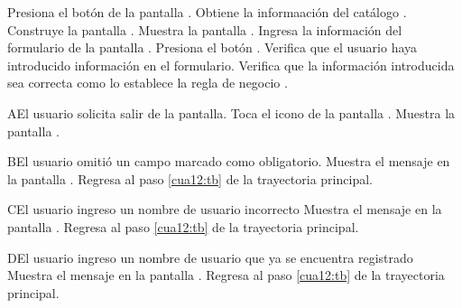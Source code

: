  \begin{UCtrayectoria}
    \UCpaso[\UCactor] Presiona el botón  de la pantalla .
    \UCpaso[\UCsist] Obtiene la informaación del catálogo .
    \UCpaso[\UCsist] Construye la pantalla .
    \UCpaso[\UCsist] Muestra la pantalla .
    \UCpaso[\UCactor] Ingresa la información del formulario de la pantalla . \label{cua15:tb} 
    \UCpaso[\UCactor] Presiona el botón .
    \UCpaso[\UCsist] Verifica que el usuario haya introducido información en el formulario.
    \UCpaso[\UCsist] Verifica que la información introducida sea correcta como lo establece la regla de negocio .
    

 \end{UCtrayectoria}



 
 \begin{UCtrayectoriaA}{A}{El usuario solicita salir de la pantalla.}
    \UCpaso[\UCactor] Toca el icono \btnRegresar de la pantalla .
	\UCpaso[\UCsist] Muestra la pantalla . 
 \end{UCtrayectoriaA}

 \begin{UCtrayectoriaA}{B}{El usuario omitió un campo marcado como obligatorio.}
 	\UCpaso[\UCsist] Muestra el mensaje  en la pantalla .
	\UCpaso[] Regresa al paso \ref{cua12:tb} de la trayectoria principal. 
	
\end{UCtrayectoriaA}


 \begin{UCtrayectoriaA}{C}{El usuario ingreso un nombre de usuario incorrecto}
	\UCpaso[\UCsist] Muestra el mensaje  en la pantalla .
	\UCpaso[] Regresa al paso \ref{cua12:tb} de la trayectoria principal. 
	
\end{UCtrayectoriaA}

 \begin{UCtrayectoriaA}{D}{El usuario ingreso un nombre de usuario que ya se encuentra registrado}
	\UCpaso[\UCsist] Muestra el mensaje  en la pantalla .
	\UCpaso[] Regresa al paso \ref{cua12:tb} de la trayectoria principal. 
	
\end{UCtrayectoriaA}

